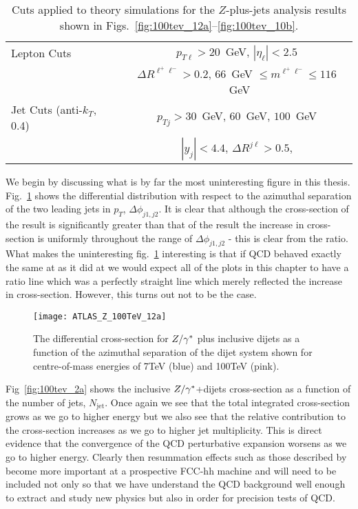 	\begin{table}[bth]
	  \centering
	  \begin{tabular}{|l|c|}
	    \hline
	    Lepton Cuts & $p_{T\ell}>20$~GeV, \; $|\eta_\ell|<2.5$ \\
	    & $\Delta R^{\ell^+\ell^-} > 0.2$, \; $66$~GeV $\leq m^{\ell^+\ell^-} \leq
	      116$~GeV \\ \hline
	    Jet Cuts (anti-$k_T$, 0.4) & $p_{Tj}>30$~GeV, $60$~GeV, $100$~GeV \\
	    &  $|y_j|<4.4$, \;$\Delta R^{j\ell} >0.5$,  \\
	\hline
	  \end{tabular}
	  \caption{Cuts applied to theory simulations for the \htev
	    $Z$-plus-jets analysis results shown in Figs.~\eqref{fig:100tev_12a}--\eqref{fig:100tev_10b}.}
	  \label{tab:atlascuts100}
	\end{table}

	We begin by discussing what is by far the most uninteresting figure in this thesis.  Fig.~\ref{fig:100tev_12a}
	shows the differential distribution with respect to the azimuthal separation of the two leading jets in
	$p_T$, $\Delta\phi_{j1, j2}$.  It is clear that although the cross-section of the \htev result is
	significantly greater than that of the \stev result the increase in cross-section is uniformly
	throughout the range of $\Delta\phi_{j1, j2}$ - this is clear from the ratio.  What makes the
	uninteresting fig.~\ref{fig:100tev_12a} interesting is that if QCD behaved exactly the same at \htev
	as it did at \stev we would expect all of the plots in this chapter to have a ratio line which
	was a perfectly straight line which merely reflected the increase in cross-section.  However, this
	turns out not to be the case.

	\begin{figure}[bth]
		\centering
		\texttt{[image: ATLAS\_Z\_100TeV\_12a]}
		\caption{The differential cross-section for $Z/\gamma^*$ plus inclusive dijets as a
		function of the azimuthal separation of the dijet system shown for centre-of-mass
		energies of 7TeV (blue) and 100TeV (pink).}
		\label{fig:100tev_12a}
	\end{figure}

	Fig~\ref{fig:100tev_2a} shows the inclusive $Z/\gamma^*$+dijets cross-section as a function of the number
	of jets, $N_{\text{jet}}$.  Once again we see that the total integrated cross-section grows as we
	go to higher energy but we also see that the relative contribution to the cross-section increases
	as we go to higher jet multiplicity.  This is direct evidence that the convergence of the
	QCD perturbative expansion worsens as we go to higher energy.  Clearly then resummation effects
	such as those described by \hej become more important at a prospective FCC-hh machine and will need
	to be included not only so that we have understand the QCD background well enough to extract and
	study new physics but also in order for precision tests of QCD.

